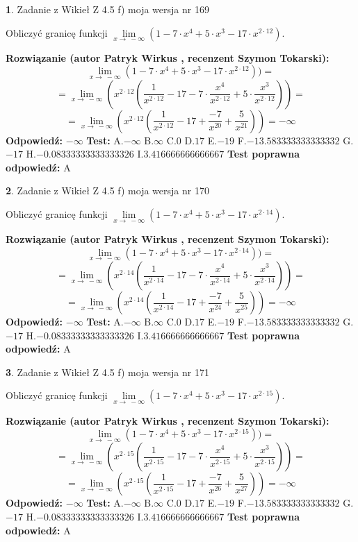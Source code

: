 \documentclass[12pt, a4paper]{article}
\theoremstyle{definition} %
\newtheorem{zad}{}
\newcommand{\zadStart}[1]{\begin{zad}#1\newline}
\newcommand{\zadStop}{\end{zad}}
\newcommand{\rozwStart}[2]{\noindent \textbf{Rozwiązanie (autor #1 , recenzent #2): }\newline}
\newcommand{\rozwStop}{\newline}
\newcommand{\odpStart}{\noindent \textbf{Odpowiedź:}\newline}
\newcommand{\odpStop}{\newline}
\newcommand{\testStart}{\noindent \textbf{Test:}\newline}
\newcommand{\testStop}{\newline}
\newcommand{\kluczStart}{\noindent \textbf{Test poprawna odpowiedź:}\newline}
\newcommand{\kluczStop}{\newline}
\begin{document}
\zadStart{Zadanie z Wikieł Z 4.5 f) moja wersja nr 169}


Obliczyć granicę funkcji  $\lim\limits_{x\to\ -\infty}(1 - 7 \cdot x^{4}+5 \cdot x^{3}- 17 \cdot x^{2\cdot12})$.
\zadStop
\rozwStart{Patryk Wirkus}{Szymon Tokarski}
$$\lim\limits_{x\to\ -\infty}(1 - 7 \cdot x^{4}+5 \cdot x^{3}- 17 \cdot x^{2\cdot12}))=$$
$$=\lim\limits_{x\to\ -\infty}(x^{2\cdot12}(\frac{1}{x^{2\cdot12}}-17 -7 \cdot \frac{x^{4}}{x^{2\cdot12}}+5 \cdot \frac{x^{3}}{x^{2\cdot12}}))=$$
$$=\lim\limits_{x\to\ -\infty}(x^{2\cdot12}(\frac{1}{x^{2\cdot12}}-17 + \frac{-7}{x^{20}}+ \frac{5}{x^{21}}))=-\infty$$
\rozwStop
\odpStart
$-\infty$
\odpStop
\testStart
A.$-\infty$ B.$\infty$ C.$0$ D.$17$ E.$-19$
F.$-13.583333333333332$ G.$-17$
H.$-0.08333333333333326$
I.$3.416666666666667$
\testStop
\kluczStart
A
\kluczStop



\zadStart{Zadanie z Wikieł Z 4.5 f) moja wersja nr 170}


Obliczyć granicę funkcji  $\lim\limits_{x\to\ -\infty}(1 - 7 \cdot x^{4}+5 \cdot x^{3}- 17 \cdot x^{2\cdot14})$.
\zadStop
\rozwStart{Patryk Wirkus}{Szymon Tokarski}
$$\lim\limits_{x\to\ -\infty}(1 - 7 \cdot x^{4}+5 \cdot x^{3}- 17 \cdot x^{2\cdot14}))=$$
$$=\lim\limits_{x\to\ -\infty}(x^{2\cdot14}(\frac{1}{x^{2\cdot14}}-17 -7 \cdot \frac{x^{4}}{x^{2\cdot14}}+5 \cdot \frac{x^{3}}{x^{2\cdot14}}))=$$
$$=\lim\limits_{x\to\ -\infty}(x^{2\cdot14}(\frac{1}{x^{2\cdot14}}-17 + \frac{-7}{x^{24}}+ \frac{5}{x^{25}}))=-\infty$$
\rozwStop
\odpStart
$-\infty$
\odpStop
\testStart
A.$-\infty$ B.$\infty$ C.$0$ D.$17$ E.$-19$
F.$-13.583333333333332$ G.$-17$
H.$-0.08333333333333326$
I.$3.416666666666667$
\testStop
\kluczStart
A
\kluczStop



\zadStart{Zadanie z Wikieł Z 4.5 f) moja wersja nr 171}


Obliczyć granicę funkcji  $\lim\limits_{x\to\ -\infty}(1 - 7 \cdot x^{4}+5 \cdot x^{3}- 17 \cdot x^{2\cdot15})$.
\zadStop
\rozwStart{Patryk Wirkus}{Szymon Tokarski}
$$\lim\limits_{x\to\ -\infty}(1 - 7 \cdot x^{4}+5 \cdot x^{3}- 17 \cdot x^{2\cdot15}))=$$
$$=\lim\limits_{x\to\ -\infty}(x^{2\cdot15}(\frac{1}{x^{2\cdot15}}-17 -7 \cdot \frac{x^{4}}{x^{2\cdot15}}+5 \cdot \frac{x^{3}}{x^{2\cdot15}}))=$$
$$=\lim\limits_{x\to\ -\infty}(x^{2\cdot15}(\frac{1}{x^{2\cdot15}}-17 + \frac{-7}{x^{26}}+ \frac{5}{x^{27}}))=-\infty$$
\rozwStop
\odpStart
$-\infty$
\odpStop
\testStart
A.$-\infty$ B.$\infty$ C.$0$ D.$17$ E.$-19$
F.$-13.583333333333332$ G.$-17$
H.$-0.08333333333333326$
I.$3.416666666666667$
\testStop
\kluczStart
A
\kluczStop
\end{document}

